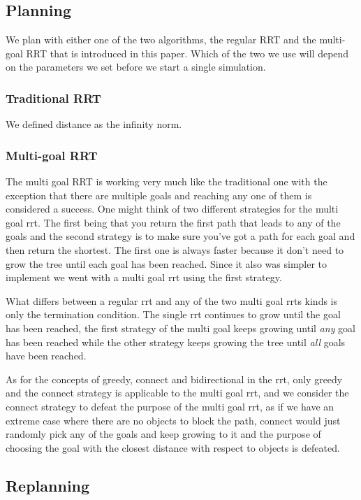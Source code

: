 \documentclass[letterpaper, 10 pt, conference]{ieeeconf}  %
\begin{document}
\subsection{Planning}

We plan with either one of the two algorithms, the regular RRT and the
multi-goal RRT that is introduced in this paper. Which of the two we use
will depend on the parameters we set before we start a single
simulation.

\subsubsection{Traditional RRT}

We defined distance as the infinity norm.

\subsubsection{Multi-goal RRT}

The multi goal RRT is working very much like the traditional one with
the exception that there are multiple goals and reaching any one of them
is considered a success. One might think of two different strategies for
the multi goal rrt. The first being that you return the first path that
leads to any of the goals and the second strategy is to make sure you've
got a path for each goal and then return the shortest. The first one is
always faster because it don't need to grow the tree until each goal has
been reached. Since it also was simpler to implement we went with a
multi goal rrt using the first strategy.

What differs between a regular rrt and any of the two multi goal rrts
kinds is only the termination condition. The single rrt continues to
grow until the goal has been reached, the first strategy of the multi
goal keeps growing until \emph{any} goal has been reached while the
other strategy keeps growing the tree until \emph{all} goals have been
reached.

As for the concepts of greedy, connect and bidirectional in the rrt,
only greedy and the connect strategy is applicable to the multi goal
rrt, and we consider the connect strategy to defeat the purpose of the
multi goal rrt, as if we have an extreme case where there are no objects
to block the path, connect would just randomly pick any of the goals and
keep growing to it and the purpose of choosing the goal with the closest
distance with respect to objects is defeated.

\subsection{Replanning}
\end{document}

